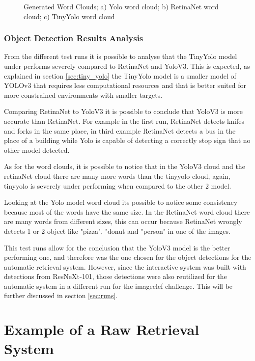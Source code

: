 \begin{figure}[H]
\begin{subfigure}{0.3\textwidth}
      \caption{}
      \end{subfigure}
      \caption{Generated Word Clouds; a) Yolo word cloud; b) RetinaNet word cloud; c) TinyYolo word cloud}
    \end{figure}

    \newpage
    

    \subsubsection{Object Detection Results Analysis}
      \label{sec:results_objet}


     From the different test runs it is possible to analyse that the TinyYolo model under performs severely compared to RetinaNet and YoloV3. This is expected, as explained in section \ref{sec:tiny_yolo} the TinyYolo model is a smaller model of YOLOv3 that requires less computational resources and that is better suited for more constrained environments with smaller targets.

     Comparing RetinaNet to YoloV3 it is possible to conclude that YoloV3 is more accurate than RetinaNet. For example in the first run, RetinaNet detects knifes and forks in the same place, in third example RetinaNet detects a bus in the place of a building while Yolo is capable of detecting a correctly stop sign that no other model detected.

     As for the word clouds, it is possible to notice that in the YoloV3 cloud and the retinaNet cloud there are many more words than the tinyyolo cloud, again, tinyyolo is severely under performing when compared to the other 2 model.
     
     Looking at the Yolo model word cloud its possible to notice some consistency because most of the words have the same size. In the RetinaNet word cloud there are many words from different sizes, this can occur because RetinaNet wrongly detects 1 or 2 object like "pizza", "donut and "person" in one of the images.

     This test runs allow for the conclusion that the YoloV3 model is the better performing one, and therefore was the one chosen for the object detections for the automatic retrieval system. However, since the interactive system was built with detections from ResNeXt-101, those detections were also reutilized for the automatic system in a different run for the imageclef challenge. This will be further discussed in section \ref{sec:runs}.


\section{Example of a Raw Retrieval System}
\label{sec:alpha_retrieval}

